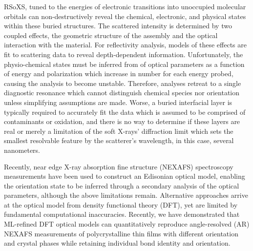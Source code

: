 RSoXS, tuned to the energies of electronic transitions into unoccupied molecular orbitals can non-destructively reveal the chemical, electronic, and physical states within these buried structures\autocite{grabnerResonantSoftXRay2025,andrleNanostructureCharacterizationRSoXS2026,andrleUsingFEMbasedMaxwell2025a}. The scattered intensity is determined by two coupled effects, the geometric structure of the assembly and the optical interaction with the material. For reflectivity analysis, models of these effects are fit to scattering data to reveal depth-dependent information.\autocite{grabnerResonantSoftXRay2025,ferronCharacterizationInterfacialOrientation2022,wangResonantSoftXray2007,yanAccurateFacileDetermination2013,mezgerMolecularOrientationSoft2011,ferronCompositionDictatesMolecular2023} Unfortunately, the physio-chemical states must be inferred from of optical parameters as a function of energy and polarization which increase in number for each energy probed, causing the analysis to become unstable. Therefore, analyses retreat to a single diagnostic resonance which cannot distinguish chemical species nor orientation unless simplifying assumptions are made.\autocite{ferronCharacterizationInterfacialOrientation2022,liPatternenhancedResonantSoft2026,nguyenResonantSoftXray2024a} Worse, a buried interfacial layer is typically required to accurately fit the data which is assumed to be comprised of contaminants or oxidation,\autocite{ferronCharacterizationInterfacialOrientation2022,wangResonantSoftXray2007,mezgerMolecularOrientationSoft2011,ferronCompositionDictatesMolecular2023} and there is no way to determine if these layers are real or merely a limitation of the soft X-rays' diffraction limit which sets the smallest resolvable feature by the scatterer's wavelength, in this case, several nanometers.

Recently, near edge X-ray absorption fine structure (NEXAFS) spectroscopy measurements have been used to construct an Edisonian optical model, enabling the orientation state to be inferred through a secondary analysis of the optical parameters, although the above limitations remain.\autocite{ferronCharacterizationInterfacialOrientation2022,wangResonantSoftXray2007,yanAccurateFacileDetermination2013,ferronCompositionDictatesMolecular2023,thelenMolecularOrientationDepth2020} Alternative approaches arrive at the optical model from density functional theory (DFT), yet are limited by fundamental computational inaccuracies.\autocite{pasqualiStructuralElectronicProperties2014a,capelliQuantitativeResonantSoft2019,pasqualiAnalysisResonantSoft2021} Recently, we have demonstrated that ML-refined DFT optical models can quantitatively reproduce angle-resolved (AR) NEXAFS measurements of polycrystalline thin films with different orientation and crystal phases while retaining individual bond identity and orientation.\autocite{murciaQuantitativeBondTraceableResonant2026}

